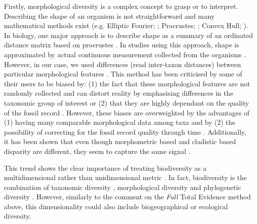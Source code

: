 Firstly, morphological diversity is a complex concept to grasp or to interpret.
Describing the shape of an organism is not straightforward and many mathematical methods exist (e.g. Elliptic Fourier; \citealt{Fourier1982}; Procrustes; \citealt{JamesRohlf1993129}; Convex Hull; \citealt{ANDREW1979216}).
In biology, one major approach is to describe shape as a summary of an ordinated distance matrix based on procrustes \citep[i.e. a geometric morphometric approach][]{zelditch2012geometric}.
In studies using this approach, shape is approximated by actual continuous measurement collected from the organisms \citep[e.g.][]{friedmanexplosive2010,hopkinsdecoupling2013,finlay2015morphological}.
However, in our case, we used differences (read inter-taxon distances) between particular morphological features \citep[e.g.][]{foote1997evolution,Wills2001,Wesley-Hunt2005}.
This method has been criticised by some of their users to be biased by: (1) the fact that these morphological features are not randomly collected and can distort reality by emphasising differences in the taxonomic group of interest \citep{Hopkins24032015}
 or (2) that they are highly dependant on the quality of the fossil record \citep{Butler2012}.
However, these biases are overweighted by the advantages of (1) having many comparable morphological data among taxa \citep{Brusatte12092008} and by (2) the possibility of correcting for the fossil record quality through time \citep{Butler2012}.
Additionally, it has been shown that even though morphometric based and cladistic based disparity are different, they seem to capture the same signal \citep{foth2012different,hetherington2015cladistic}.

%
%

This trend shows the clear importance of treating biodiversity as a multidimensional rather than unidimensional metric \citep[similarly as in ecology;][]{DonohueDim}.
In fact, biodiversity is the combination of taxonomic diversity \citep[e.g.][]{Stadler12042011}, morphological diversity \citep[from cladistics or morphometrics;][]{hetherington2015cladistic} and phylogenetic diversity \citep[e.g. the evolutionary rates regimes;][]{Close2015}.
However, similarly to the comment on the \textit{Full} Total Evidence method above, this dimensionality could also include biogeographical or ecological diversity.

